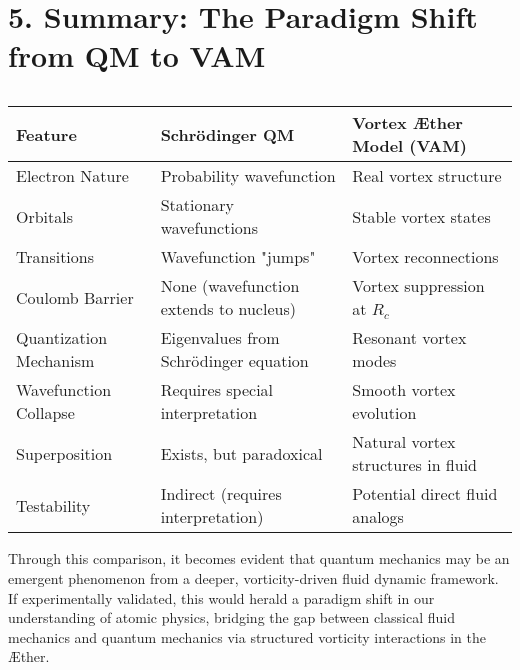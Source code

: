 \section*{5. Summary: The Paradigm Shift from QM to VAM}

\begin{table}[h]
    \centering
    \begin{tabular}{lll}
        \toprule
        \textbf{Feature} & \textbf{Schrödinger QM} & \textbf{Vortex Æther Model (VAM)} \\
        \midrule
        Electron Nature & Probability wavefunction & Real vortex structure \\
        Orbitals & Stationary wavefunctions & Stable vortex states \\
        Transitions & Wavefunction "jumps" & Vortex reconnections \\
        Coulomb Barrier & None (wavefunction extends to nucleus) & Vortex suppression at \(R_c\) \\
        Quantization Mechanism & Eigenvalues from Schrödinger equation & Resonant vortex modes \\
        Wavefunction Collapse & Requires special interpretation & Smooth vortex evolution \\
        Superposition & Exists, but paradoxical & Natural vortex structures in fluid \\
        Testability & Indirect (requires interpretation) & Potential direct fluid analogs \\
        \bottomrule
    \end{tabular}
    \caption{}
    \label{tab:QM-VAM-comparison}
\end{table}

Through this comparison, it becomes evident that quantum mechanics may be an emergent phenomenon from a deeper, vorticity-driven fluid dynamic framework. If experimentally validated, this would herald a paradigm shift in our understanding of atomic physics, bridging the gap between classical fluid mechanics and quantum mechanics via structured vorticity interactions in the Æther.

